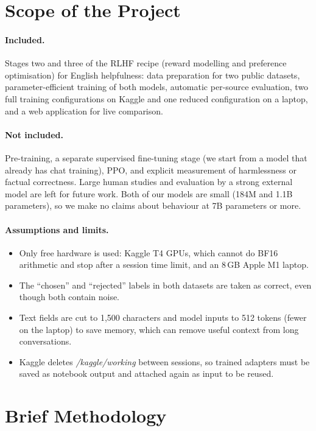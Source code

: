 \section{Scope of the Project}
\label{sec:scope}

\paragraph{Included.} Stages two and three of the RLHF recipe (reward modelling and preference optimisation) for English helpfulness: data preparation for two public datasets, parameter-efficient training of both models, automatic per-source evaluation, two full training configurations on Kaggle and one reduced configuration on a laptop, and a web application for live comparison.

\paragraph{Not included.} Pre-training, a separate supervised fine-tuning stage (we start from a model that already has chat training), PPO, and explicit measurement of harmlessness or factual correctness. Large human studies and evaluation by a strong external model are left for future work. Both of our models are small (184M and 1.1B parameters), so we make no claims about behaviour at 7B parameters or more.

\paragraph{Assumptions and limits.}
\begin{itemize}
  \item Only free hardware is used: Kaggle T4 GPUs, which cannot do BF16 arithmetic and stop after a session time limit, and an 8\,GB Apple M1 laptop.
  \item The ``chosen'' and ``rejected'' labels in both datasets are taken as correct, even though both contain noise.
  \item Text fields are cut to 1,500 characters and model inputs to 512 tokens (fewer on the laptop) to save memory, which can remove useful context from long conversations.
  \item Kaggle deletes \emph{/kaggle/working} between sessions, so trained adapters must be saved as notebook output and attached again as input to be reused.
\end{itemize}

\section{Brief Methodology}
\label{sec:brief-method}

